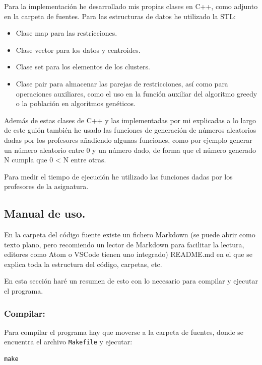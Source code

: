 \documentclass[12pt, spanish]{article}
\begin{document}
Para la implementación he desarrollado mis propias clases en C++, como adjunto en la carpeta de fuentes. Para las estructuras de datos he utilizado la STL:

\begin{itemize}
	\item Clase map para las restricciones.
	\item Clase vector para los datos y centroides.
	\item Clase set para los elementos de los clusters.
	\item Clase pair para almacenar las parejas de restricciones, así como para operaciones auxiliares, como el uso en la función auxiliar del algoritmo greedy o la población en algoritmos genéticos.
\end{itemize}

Además de estas clases de C++ y las implementadas por mi explicadas a lo largo de este guión también he usado las funciones de generación de números aleatorios dadas por los profesores añadiendo algunas funciones, como por ejemplo generar un número aleatorio entre 0 y un número dado, de forma que el número generado N cumpla que 0 < N entre otras.

Para medir el tiempo de ejecución he utilizado las funciones dadas por los profesores de la asignatura.


\subsection{Manual de uso.}

En la carpeta del código fuente existe un fichero Markdown (se puede abrir como texto plano, pero recomiendo un lector de Markdown para facilitar la lectura, editores como Atom o VSCode tienen uno integrado) README.md en el que se explica toda la estructura del código, carpetas, etc.

En esta sección haré un resumen de esto con lo necesario para compilar y ejecutar el programa.

\subsubsection{Compilar:}

Para compilar el programa hay que moverse a la carpeta de fuentes, donde se encuentra el archivo \texttt{Makefile} y ejecutar:

\begin{lstlisting}
make
\end{lstlisting}
\end{document}
